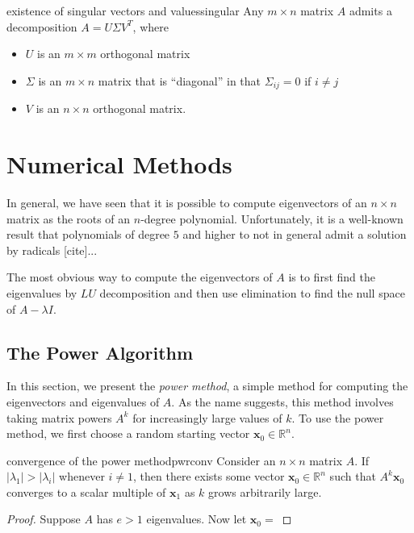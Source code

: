 \documentclass{article}
\let\vec\mathbf
\begin{document}
\begin{theorem}{existence of singular vectors and values}{singular}
  Any $m \times n$ matrix $A$ admits a decomposition $A = U \Sigma V^T$, where
  \begin{itemize}
    \item $U$ is an $m \times m$ orthogonal matrix
    \item $\Sigma$ is an $m \times n$ matrix that is ``diagonal'' in that $\Sigma_{ij} = 0$ if $i \neq j$
    \item $V$ is an $n \times n$ orthogonal matrix.
  \end{itemize}
\end{theorem}

\section{Numerical Methods}
In general, we have seen that it is possible to compute eigenvectors of an $n \times n$ matrix as the roots of an $n$-degree polynomial. Unfortunately, it is a well-known result that polynomials of degree $5$ and higher to not in general admit a solution by radicals [cite]...

The most obvious way to compute the eigenvectors of $A$ is to first find the eigenvalues by $LU$ decomposition and then use elimination to find the null space of $A - \lambda I$.

\subsection{The Power Algorithm}
In this section, we present the \textit{power method}, a simple method for computing the eigenvectors and eigenvalues of $A$. As the name suggests, this method involves taking matrix powers $A^k$ for increasingly large values of $k$. To use the power method, we first choose a random starting vector $\vec{x}_0 \in \mathbb{R}^n$.

\begin{theorem}{convergence of the power method}{pwrconv}
  Consider an $n \times n$ matrix $A$. If $|\lambda_1| > |\lambda_i|$ whenever $i \neq 1$, then there exists some vector $\vec{x}_0 \in \mathbb{R}^n$ such that $A^k\vec{x}_0$ converges to a scalar multiple of $\vec{x}_1$ as $k$ grows arbitrarily large.
\end{theorem}
\begin{proof}
  Suppose $A$ has $e > 1$ eigenvalues. Now let $\vec{x}_0 = $
\end{proof}
\end{document}
